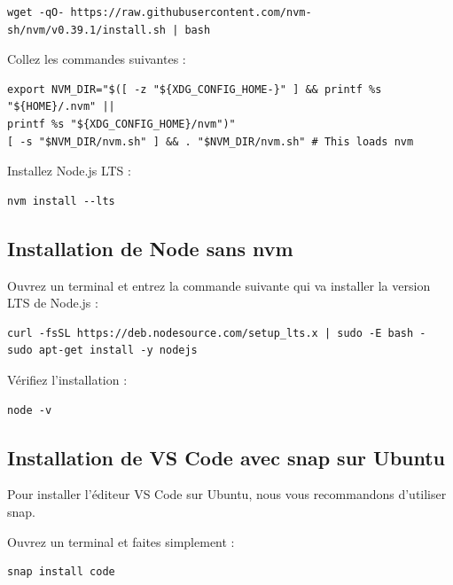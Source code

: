 \documentclass{article}
\begin{document}
\begin{verbatim}
wget -qO- https://raw.githubusercontent.com/nvm-sh/nvm/v0.39.1/install.sh | bash
\end{verbatim}

Collez les commandes suivantes :

\begin{verbatim}
export NVM_DIR="$([ -z "${XDG_CONFIG_HOME-}" ] && printf %s "${HOME}/.nvm" || 
printf %s "${XDG_CONFIG_HOME}/nvm")"
[ -s "$NVM_DIR/nvm.sh" ] && . "$NVM_DIR/nvm.sh" # This loads nvm
\end{verbatim}

Installez Node.js LTS :

\begin{verbatim}
nvm install --lts
\end{verbatim}

\subsection{Installation de Node sans nvm}
Ouvrez un terminal et entrez la commande suivante qui va installer la version LTS de Node.js :
\begin{verbatim}
curl -fsSL https://deb.nodesource.com/setup_lts.x | sudo -E bash -
sudo apt-get install -y nodejs
\end{verbatim}

Vérifiez l'installation :
\begin{verbatim}
node -v
\end{verbatim}

\subsection{Installation de VS Code avec snap sur Ubuntu}
Pour installer l'éditeur VS Code sur Ubuntu, nous vous recommandons d'utiliser snap.

Ouvrez un terminal et faites simplement :
\begin{verbatim}
snap install code
\end{verbatim}
\end{document}
